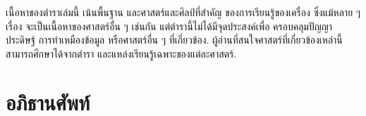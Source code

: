 เนื้อหาของตำราเล่มนี้ เน้นพื้นฐาน และศาสตร์และศิลป์ที่สำคัญ
ของการเรียนรู้ของเครื่อง
ซึ่งแม้หลาย ๆ เรื่อง
จะเป็นเนื้อหาของศาสตร์อื่น ๆ เช่นกัน
แต่ตำรานี้ไม่ได้มีจุดประสงค์เพื่อ
ครอบคลุมปัญญาประดิษฐ์ 
การทำเหมืองข้อมูล หรือศาสตร์อื่น ๆ ที่เกี่ยวข้อง.
ผู้อ่านที่สนใจศาสตร์ที่เกี่ยวข้องเหล่านี้ สามารถศึกษาได้จากตำรา
และแหล่งเรียนรู้เฉพาะของแต่ละศาสตร์.

%
%
%
%
%




\section{อภิธานศัพท์}


